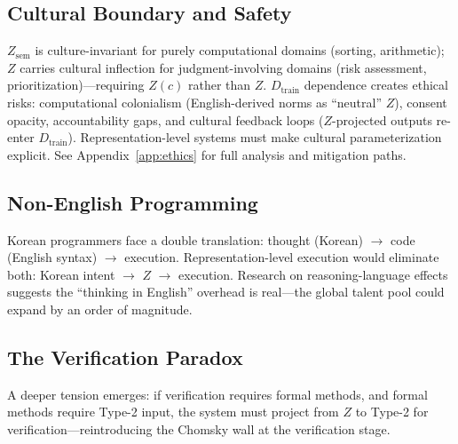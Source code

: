 \documentclass[11pt]{article}
\theoremstyle{definition}
\newcommand{\Zsem}{Z_{\text{sem}}}
\newcommand{\Dtrain}{D_{\text{train}}}
\begin{document}
\subsection{Cultural Boundary and Safety}

$\Zsem$ is culture-invariant for purely computational domains (sorting, arithmetic); $Z$ carries cultural inflection for judgment-involving domains (risk assessment, prioritization)---requiring $Z(c)$ rather than $Z$. $\Dtrain$ dependence creates ethical risks: computational colonialism (English-derived norms as ``neutral'' $Z$), consent opacity, accountability gaps, and cultural feedback loops ($Z$-projected outputs re-enter $\Dtrain$). Representation-level systems must make cultural parameterization explicit. See Appendix~\ref{app:ethics} for full analysis and mitigation paths.

\subsection{Non-English Programming}

Korean programmers face a double translation: thought (Korean) $\to$ code (English syntax) $\to$ execution. Representation-level execution would eliminate both: Korean intent $\to$ $Z$ $\to$ execution. Research on reasoning-language effects~\cite{li2026reasoning} suggests the ``thinking in English'' overhead is real---the global talent pool could expand by an order of magnitude.

\subsection{The Verification Paradox}\label{sec:verification}

A deeper tension emerges: if verification requires formal methods, and formal methods require Type-2 input, the system must project from $Z$ to Type-2 for verification---reintroducing the Chomsky wall at the verification stage.

\begin{center}
\end{center}
\end{document}
